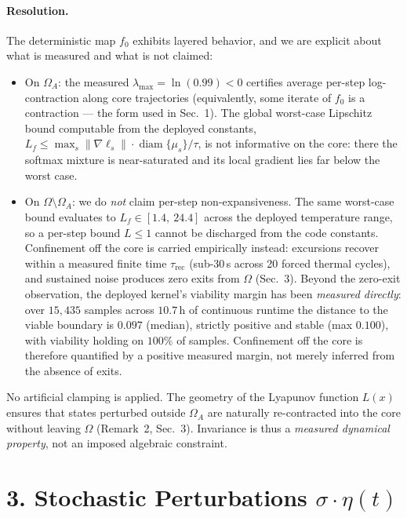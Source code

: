 \documentclass[11pt]{article}
\begin{document}
\paragraph{Resolution.} The deterministic map $f_0$ exhibits layered
behavior, and we are explicit about what is measured and what is not claimed:
\begin{itemize}
  \item On $\Omega_A$: the measured $\lambda_{\max} = \ln(0.99) < 0$
        certifies average per-step log-contraction along core trajectories
        (equivalently, some iterate of $f_0$ is a contraction --- the form
        used in Sec.~1). The global worst-case Lipschitz bound computable
        from the deployed constants,
        $L_f \le \max_s \lVert\nabla \ell_s\rVert \cdot
        \operatorname{diam}\{\mu_s\}/\tau$, is not informative on the core:
        there the softmax mixture is near-saturated and its local gradient
        lies far below the worst case.
  \item On $\Omega \setminus \Omega_A$: we do \emph{not} claim per-step
        non-expansiveness. The same worst-case bound evaluates to
        $L_f \in [1.4,\ 24.4]$ across the deployed temperature range, so a
        per-step bound $L \le 1$ cannot be discharged from the code
        constants. Confinement off the core is carried empirically instead:
        excursions recover within a measured finite time
        $\tau_{\mathrm{rec}}$ (sub-30\,s across 20 forced thermal cycles),
        and sustained noise produces zero exits from $\Omega$ (Sec.~3).
        Beyond the zero-exit observation, the deployed kernel's viability
        margin has been \emph{measured directly}: over $15{,}435$ samples
        across $10.7$\,h of continuous runtime the distance to the viable
        boundary is $0.097$ (median), strictly positive and stable
        (max $0.100$), with viability holding on $100\%$ of samples.
        Confinement off the core is therefore quantified by a positive
        measured margin, not merely inferred from the absence of exits.
\end{itemize}
No artificial clamping is applied. The geometry of the Lyapunov function
$L(x)$ ensures that states perturbed outside $\Omega_A$ are naturally
re-contracted into the core without leaving $\Omega$ (Remark~2, Sec.~3).
Invariance is thus a \emph{measured dynamical property}, not an imposed
algebraic constraint.

\section*{3. Stochastic Perturbations $\sigma \cdot \eta(t)$}
\end{document}

